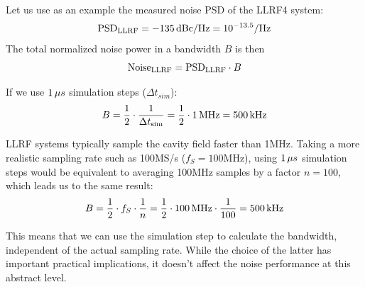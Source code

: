 \documentclass[a4paper,12pt]{article}
\begin{document}
Let us use as an example the measured noise PSD of the LLRF4 system:
\begin{equation}
  \centering {\rm PSD}_{\rm LLRF} = -135\thinspace{\rm dBc/Hz} = 10^{-13.5} {\rm /Hz}
\end{equation}
The total normalized noise power in a bandwidth $B$ is then
\begin{equation}
  \centering {\rm Noise}_{\rm LLRF} ={\rm PSD}_{\rm LLRF}\cdot B
  \label{eq:PSD_to_noise}
\end{equation}

\noindent If we use $1\thinspace\mu s$ simulation steps ($\Delta t_{sim}$):
\begin{equation}
  \centering B = \frac{1}{2} \cdot \frac{1}{\Delta t_{\rm sim}}=\frac{1}{2} \cdot 1\thinspace {\rm MHz} = 500\thinspace {\rm kHz}
\end{equation}

LLRF systems typically sample the cavity field faster than 1\thinspace MHz. Taking a more realistic sampling rate such as 100\thinspace MS/s ($f_S=100$\thinspace MHz), using $1\thinspace\mu s$ simulation steps would be equivalent to averaging 100\thinspace MHz samples by a factor $n=100$, which leads us to the same result:
\begin{equation}
  \centering B = \frac{1}{2} \cdot f_S \cdot \frac{1}{n} = \frac{1}{2} \cdot 100\thinspace{\rm MHz} \cdot \frac{1}{100} = 500\thinspace{\rm kHz}
\end{equation}

\noindent This means that we can use the simulation step to calculate the bandwidth, independent of the actual sampling rate.  While the choice of the latter has important practical implications, it doesn't affect the noise performance at this abstract level.
\end{document}
